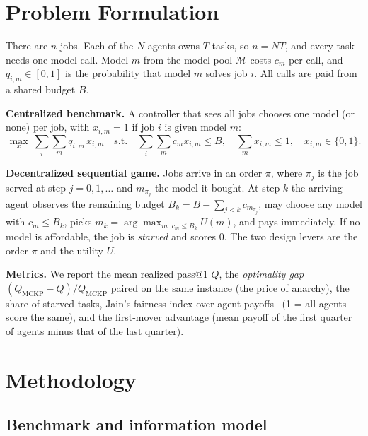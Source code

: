 \documentclass{article}
\begin{document}
\section{Problem Formulation}

There are $n$ jobs. Each of the $N$ agents owns $T$ tasks, so $n = NT$, and every task needs one model call. Model $m$ from the model pool $\mathcal{M}$ costs $c_m$ per call, and $q_{i,m}\in[0,1]$ is the probability that model $m$ solves job $i$. All calls are paid from a shared budget $B$.

\textbf{Centralized benchmark.} A controller that sees all jobs chooses one model (or none) per job, with $x_{i,m}=1$ if job $i$ is given model $m$:
\begin{equation}
\max_{x}\ \sum_{i}\sum_{m} q_{i,m}\,x_{i,m}\quad \text{s.t.}\quad \sum_{i}\sum_{m} c_m x_{i,m}\le B,\quad \sum_m x_{i,m}\le 1,\quad x_{i,m}\in\{0,1\}.
\label{eq:mckp}
\end{equation}

\textbf{Decentralized sequential game.} Jobs arrive in an order $\pi$, where $\pi_j$ is the job served at step $j = 0, 1, \dots$ and $m_{\pi_j}$ the model it bought. At step $k$ the arriving agent observes the remaining budget $B_k = B - \sum_{j<k} c_{m_{\pi_j}}$, may choose any model with $c_m \le B_k$, picks $m_k = \arg\max_{m:\,c_m\le B_k} U(m)$, and pays immediately. If no model is affordable, the job is \emph{starved} and scores 0. The two design levers are the order $\pi$ and the utility $U$.

\textbf{Metrics.} We report the mean realized pass@1 $\bar Q$, the \emph{optimality gap} $(\bar Q_{\text{MCKP}}-\bar Q)/\bar Q_{\text{MCKP}}$ paired on the same instance (the price of anarchy), the share of starved tasks, Jain's fairness index over agent payoffs~\cite{jain1984fairness} (1 = all agents score the same), and the first-mover advantage (mean payoff of the first quarter of agents minus that of the last quarter).

\section{Methodology}

\subsection{Benchmark and information model}
\end{document}

